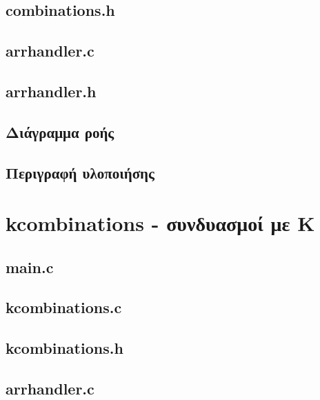 \documentclass{article}
\begin{document}
    \subsection{combinations.h}
        

    \subsection{arrhandler.c}
        

    \subsection{arrhandler.h}
        

    \subsection{Διάγραμμα ροής}

    \subsection{Περιγραφή υλοποιήσης}


\section{kcombinations - συνδυασμοί με K}

    \subsection{main.c}
        

    \subsection{kcombinations.c}
        

    \subsection{kcombinations.h}
        

    \subsection{arrhandler.c}
        
\end{document}
